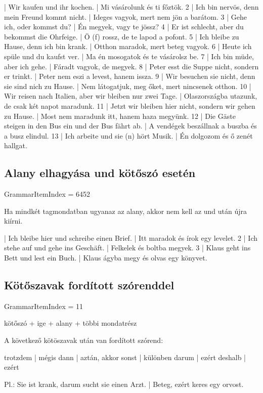\documentclass{article}
\newenvironment{desc}{\verbatim}{\endverbatim}
\newenvironment{exmp}{\verbatim}{\endverbatim}
\begin{document}
\begin{exmp}
1 | Wir kaufen und ihr kochen. | Mi vásárolunk és ti főztök.
2 | Ich bin nervös, denn mein Freund kommt nicht. | Ideges vagyok, mert nem jön a barátom.
3 | Gehe ich, oder kommst du? | Én megyek, vagy te jössz?
4 | Er ist schlecht, aber du bekommst die Ohrfeige. | Ö (f) rossz, de te lapod a pofont.
5 | Ich bleibe zu Hause, denn ich bin krank. | Otthon maradok, mert beteg vagyok.
6 | Heute ich spüle und du kaufst ver. | Ma én mosogatok és te vásárolsz be.
7 | Ich bin müde, aber ich gehe. | Fáradt vagyok, de megyek.
8 | Peter esst die Suppe nicht, sondern er trinkt. | Peter nem eszi a levest, hanem issza.
9 | Wir besuchen sie nicht, denn sie sind nich zu Hause. | Nem látogatjuk, meg őket, mert nincsenek otthon.
10 | Wir reisen nach Italien, aber wir bleiben nur zwei Tage. | Olaszországba utazunk, de csak két napot maradunk.
11 | Jetzt wir bleiben hier nicht, sondern wir gehen zu Hause. | Most nem maradunk itt, hanem haza megyünk.
12 | Die Gäste steigen in den Bus ein und der Bus fährt ab. | A vendégek beszállnak a buszba és a busz elindul.
13 | Ich arbeite und sie (n) hört Musik. | Én dolgozom és ő zenét hallgat.
\end{exmp}

\subsection{Alany elhagyása und kötőszó esetén}

GrammarItemIndex = 6452

\begin{desc}
Ha mindkét tagmondatban ugyanaz az alany, akkor nem kell az und után újra kiírni.
\end{desc}

\begin{exmp}
1 | Ich bleibe hier und schreibe einen Brief. | Itt maradok és írok egy levelet.
2 | Ich stehe auf und gehe ins Geschäft. | Felkelek és boltba megyek.
3 | Klaus geht ins Bett und lest ein Buch. | Klaus ágyba megy és olvas egy könyvet.
\end{exmp}

\subsection{Kötőszavak fordított szórenddel}

GrammarItemIndex = 11

\begin{desc}

kötőszó + ige + alany + többi mondatrész

A következő kötöszavak után van fordított szórend:

trotzdem | mégis
dann | aztán, akkor
sonst | különben
darum | ezért
deshalb | ezért


Pl.: Sie ist krank, darum sucht sie einen Arzt. | Beteg, ezért keres egy orvost.
\end{desc}
\end{document}
